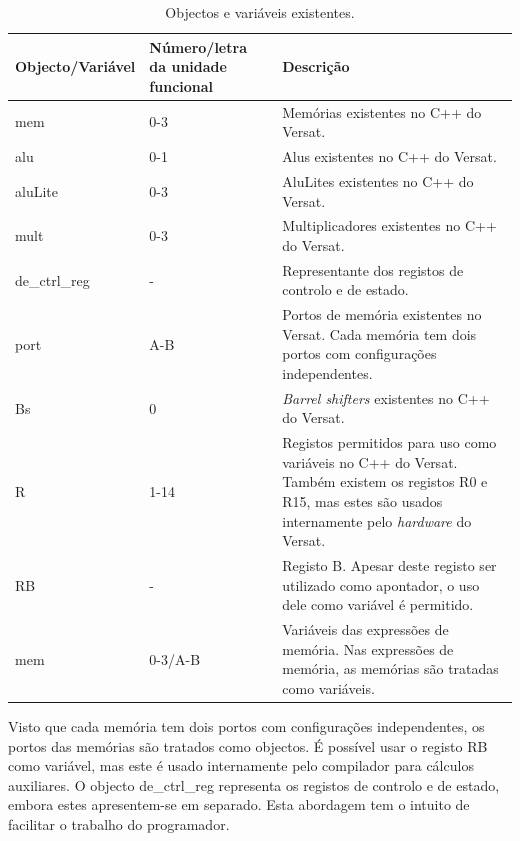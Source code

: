 \begin{table}[h!]
    \caption[Objectos e variáveis existentes.]{Objectos e variáveis existentes.}
  \begin{center}
    \begin{tabular}{|l|l|L{7cm}|}
      \hline
       Objecto/Variável & Número/letra da unidade funcional & Descrição  \\
      \hline \hline
      mem  & 0-3 & Memórias existentes no C++ do Versat.  \\
       alu & 0-1 & Alus existentes no C++ do Versat. \\
       aluLite & 0-3 & AluLites existentes no C++ do Versat.  \\
       mult & 0-3 & Multiplicadores existentes no C++ do Versat. \\
       de\_ctrl\_reg & - & Representante dos registos de controlo e de estado. \\
       port & A-B & Portos de memória existentes no Versat. Cada memória tem dois portos com configurações independentes.  \\
       Bs & 0 & {\it Barrel shifters} existentes no C++ do Versat.  \\
       R & 1-14 & Registos permitidos para uso como variáveis no C++ do Versat. Também existem os registos R0 e R15, mas estes são usados internamente pelo {\it hardware} do Versat. \\
       RB & - & Registo B. Apesar deste registo ser utilizado como apontador, o uso dele como variável é permitido.  \\
       mem & 0-3/A-B & Variáveis das expressões de memória. Nas expressões de memória, as memórias são tratadas como variáveis.  \\
       
       
      \hline
    \end{tabular}
  \end{center}
  \label{tab:objvarex}
\end{table}

Visto que cada memória tem dois portos com configurações independentes, os portos das memórias são tratados como objectos. 
É possível usar o registo RB como variável, mas este é usado internamente pelo compilador para cálculos auxiliares. 
O objecto de\_ctrl\_reg representa os registos de controlo e de estado, embora estes apresentem-se em separado. Esta abordagem tem o intuito
de facilitar o trabalho do programador.


